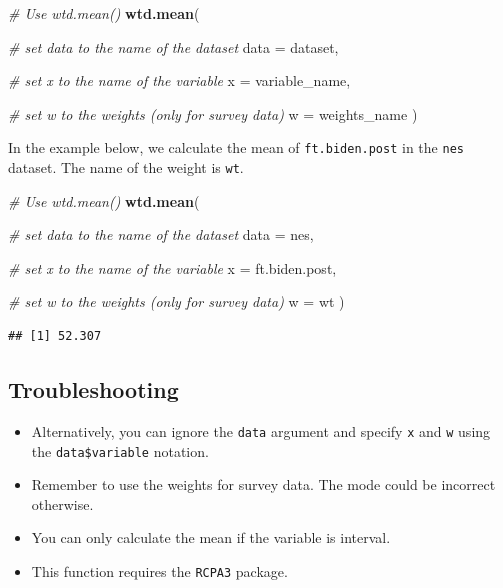 \documentclass[
]{book}
\newenvironment{Shaded}{\begin{snugshade}}{\end{snugshade}}
\newcommand{\AttributeTok}[1]{\textcolor[rgb]{0.13,0.29,0.53}{#1}}
\newcommand{\CommentTok}[1]{\textcolor[rgb]{0.56,0.35,0.01}{\textit{#1}}}
\newcommand{\FunctionTok}[1]{\textcolor[rgb]{0.13,0.29,0.53}{\textbf{#1}}}
\newcommand{\NormalTok}[1]{#1}
\providecommand{\tightlist}{%
  \setlength{\itemsep}{0pt}\setlength{\parskip}{0pt}}
\begin{document}
\begin{Shaded}
\begin{Highlighting}[]
\CommentTok{\# Use \textasciigrave{}wtd.mean()\textasciigrave{}}
\FunctionTok{wtd.mean}\NormalTok{(}
  
  \CommentTok{\# set data to the name of the dataset}
  \AttributeTok{data =}\NormalTok{ dataset,}
  
  \CommentTok{\# set x to the name of the variable}
  \AttributeTok{x =}\NormalTok{ variable\_name,}
  
  \CommentTok{\# set w to the weights (only for survey data)}
  \AttributeTok{w =}\NormalTok{ weights\_name}
\NormalTok{)}
\end{Highlighting}
\end{Shaded}

In the example below, we calculate the mean of \texttt{ft.biden.post} in the \texttt{nes} dataset. The name of the weight is \texttt{wt}.

\begin{Shaded}
\begin{Highlighting}[]
\CommentTok{\# Use \textasciigrave{}wtd.mean()\textasciigrave{}}
\FunctionTok{wtd.mean}\NormalTok{(}
  
  \CommentTok{\# set data to the name of the dataset}
  \AttributeTok{data =}\NormalTok{ nes,}
  
  \CommentTok{\# set x to the name of the variable}
  \AttributeTok{x =}\NormalTok{ ft.biden.post,}
  
  \CommentTok{\# set w to the weights (only for survey data)}
  \AttributeTok{w =}\NormalTok{ wt}
\NormalTok{)}
\end{Highlighting}
\end{Shaded}

\begin{verbatim}
## [1] 52.307
\end{verbatim}

\hypertarget{troubleshooting-29}{%
\subsection{Troubleshooting}\label{troubleshooting-29}}

\begin{itemize}
\tightlist
\item
  Alternatively, you can ignore the \texttt{data} argument and specify \texttt{x} and \texttt{w} using the \texttt{data\$variable} notation.
\item
  Remember to use the weights for survey data. The mode could be incorrect otherwise.
\item
  You can only calculate the mean if the variable is interval.
\item
  This function requires the \texttt{RCPA3} package.
\end{itemize}
\end{document}
